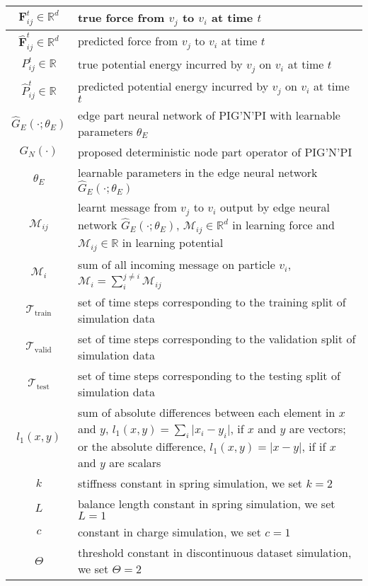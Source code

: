 \documentclass{article}
\newcommand{\abs}[1]{\lvert #1 \rvert}
\newcommand\Tstrut{\rule{0pt}{2.2ex}}         %
\newcommand\Bstrut{\rule[-1ex]{0pt}{0pt}}   %
\newcommand{\pignpi}{PIG'N'PI\xspace}
\begin{document}
\begin{table}[h!]
{\begin{tabularx}{\textwidth}{|c X|}
\hline
$\bm{F}_{ij}^t \in \mathbb{R}^{d}$ & true force from  $v_j$ to $v_i$ at time $t$  \Tstrut\Bstrut\\
\hline
$\bm{\hat{F}}_{ij}^t \in \mathbb{R}^{d}$ & predicted force from  $v_j$ to $v_i$ at time $t$  \Tstrut\Bstrut\\
\hline
$P_{ij}^t \in \mathbb{R}$ & true potential energy incurred by $v_j$ on  $v_i$  at time $t$  \Tstrut\Bstrut\\
\hline
$\hat{P}_{ij}^t \in \mathbb{R}$ & predicted potential energy incurred by $v_j$ on  $v_i$  at time $t$  \Tstrut\Bstrut\\
\hline
$\hat{G}_E( \cdot ; \theta_{E} )$ & edge part neural network of \pignpi with learnable parameters $\theta_{E}$ \Tstrut\Bstrut\\
\hline
$G_N(\cdot)$ & proposed deterministic node part operator of \pignpi  \Tstrut\Bstrut\\
\hline
$\theta_{E}$ & learnable parameters in the edge neural network $\hat{G}_E( \cdot ; \theta_{E} )$  \Tstrut\Bstrut\\
\hline
$\mathcal{M}_{ij}$ & learnt message from $v_{j}$ to $v_{i}$ output by edge neural network $\hat{G}_E( \cdot ; \theta_{E} )$, $\mathcal{M}_{ij}\in \mathbb{R}^d$ in learning force and $\mathcal{M}_{ij}\in \mathbb{R}$ in learning potential\Tstrut\Bstrut \\
\hline
$\mathcal{M}_{i}$ & sum of all incoming message on particle $v_{i}$, $\mathcal{M}_{i}=\sum_i^{j\neq i}\mathcal{M}_{ij}$  \Tstrut\Bstrut\\
\hline
$\mathcal{T}_{\text{train}}$ 
& set of time steps corresponding to the training split of simulation data  \Tstrut\Bstrut\\
\hline
$\mathcal{T}_{\text{valid}}$ 
& set of time steps corresponding to the validation split of simulation data\Tstrut\Bstrut\\
\hline
$\mathcal{T}_{\text{test}}$ 
& set of time steps corresponding to the testing split of simulation data  \Tstrut\Bstrut\\
\hline
$l_1(x, y)$ & sum of absolute differences between each element in $x$ and $y$, $l_1(x, y) = \sum_i \abs{x_i - y_i}$, if $x$ and $y$ are vectors; or the absolute difference, $l_1(x, y) = \abs{x-y}$, if if $x$ and $y$ are scalars \Tstrut\Bstrut\\
\hline
$k$
& stiffness constant in spring simulation, we set $k=2$\Tstrut\Bstrut\\
\hline
$L$ & balance length constant in spring simulation, we set $L=1$\Tstrut\Bstrut\\
\hline
$c$ & constant in charge simulation, we set $c=1$\Tstrut\Bstrut\\
\hline
$\Theta$ & threshold constant in discontinuous dataset simulation, we set $\Theta=2$\Tstrut\Bstrut\\
\hline
\end{tabularx}}
\end{table}
\end{document}
